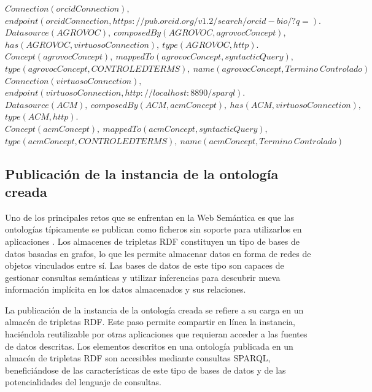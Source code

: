 \begin{minipage}{\textwidth}
$Connection(orcidConnection),$\\
$endpoint(orcidConnection, https{:}//pub{.}orcid{.}org/v1{.}2/search/orcid{-}bio/?q{=}).$\\
$Datasource(AGROVOC), \ composedBy(AGROVOC, agrovocConcept),$\\
$has(AGROVOC, virtuosoConnection), \ type(AGROVOC,http).$ \\
$Concept(agrovocConcept), \ mappedTo(agrovocConcept, syntacticQuery), $\\
$type(agrovocConcept, CONTROLEDTERMS), \ name(agrovocConcept, Termino \ Controlado)$\\
$Connection(virtuosoConnection),$
$endpoint(virtuosoConnection, http{:}//localhost{:}8890/sparql).$\\
$Datasource(ACM), \ composedBy(ACM, acmConcept), \ has(ACM, virtuosoConnection),$\\
$type(ACM,http).$ \\
$Concept(acmConcept), \ mappedTo(acmConcept,syntacticQuery),$\\
$type(acmConcept,CONTROLEDTERMS),  \ name(acmConcept, Termino \ Controlado)$\\
\label{onto:auctoritasDescription}
\end{minipage}

\subsection{Publicación de la instancia de la ontología creada}

Uno de los principales retos que se enfrentan en la Web Semántica es que las ontologías típicamente se publican como ficheros sin soporte para utilizarlos en aplicaciones \citep{viljanen2008publishing}. Los almacenes de tripletas RDF constituyen un tipo de bases de datos basadas en grafos, lo que les permite almacenar datos en forma de redes de objetos vinculados entre sí. Las bases de datos de este tipo son  capaces de gestionar consultas semánticas y utilizar inferencias para descubrir nueva información implícita en los datos almacenados y sus relaciones.

La publicación de la instancia de la ontología creada se refiere a su carga en un almacén de tripletas RDF. Este paso permite compartir en línea la instancia, haciéndola reutilizable por otras aplicaciones que requieran acceder a las fuentes de datos descritas. Los elementos descritos en una ontología publicada en un almacén de tripletas RDF son accesibles mediante consultas SPARQL, beneficiándose de las características de este tipo de bases de datos y de las potencialidades del lenguaje de consultas.

